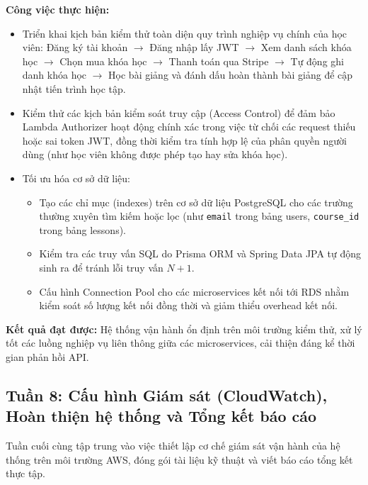 \textbf{Công việc thực hiện:}
\begin{itemize}
    \item Triển khai kịch bản kiểm thử toàn diện quy trình nghiệp vụ chính của học viên: Đăng ký tài khoản $\rightarrow$ Đăng nhập lấy JWT $\rightarrow$ Xem danh sách khóa học $\rightarrow$ Chọn mua khóa học $\rightarrow$ Thanh toán qua Stripe $\rightarrow$ Tự động ghi danh khóa học $\rightarrow$ Học bài giảng và đánh dấu hoàn thành bài giảng để cập nhật tiến trình học tập.
    \item Kiểm thử các kịch bản kiểm soát truy cập (Access Control) để đảm bảo Lambda Authorizer hoạt động chính xác trong việc từ chối các request thiếu hoặc sai token JWT, đồng thời kiểm tra tính hợp lệ của phân quyền người dùng (như học viên không được phép tạo hay sửa khóa học).
    \item Tối ưu hóa cơ sở dữ liệu:
    \begin{itemize}
        \item Tạo các chỉ mục (indexes) trên cơ sở dữ liệu PostgreSQL cho các trường thường xuyên tìm kiếm hoặc lọc (như \texttt{email} trong bảng users, \texttt{course_id} trong bảng lessons).
        \item Kiểm tra các truy vấn SQL do Prisma ORM và Spring Data JPA tự động sinh ra để tránh lỗi truy vấn $N+1$.
        \item Cấu hình Connection Pool cho các microservices kết nối tới RDS nhằm kiểm soát số lượng kết nối đồng thời và giảm thiểu overhead kết nối.
    \end{itemize}
\end{itemize}

\textbf{Kết quả đạt được:} Hệ thống vận hành ổn định trên môi trường kiểm thử, xử lý tốt các luồng nghiệp vụ liên thông giữa các microservices, cải thiện đáng kể thời gian phản hồi API.

\subsection{Tuần 8: Cấu hình Giám sát (CloudWatch), Hoàn thiện hệ thống và Tổng kết báo cáo}

Tuần cuối cùng tập trung vào việc thiết lập cơ chế giám sát vận hành của hệ thống trên môi trường AWS, đóng gói tài liệu kỹ thuật và viết báo cáo tổng kết thực tập.

